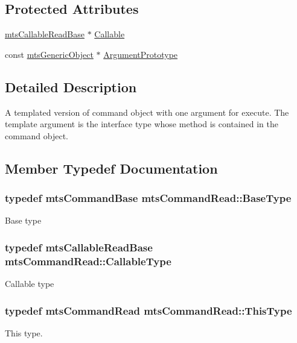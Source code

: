 \subsection*{Protected Attributes}
\begin{DoxyCompactItemize}
\item 
\hyperlink{classmts_callable_read_base}{mts\-Callable\-Read\-Base} $\ast$ \hyperlink{classmts_command_read_aa99a8b6be2493dfffc746078347ae0c8}{Callable}
\item 
const \hyperlink{classmts_generic_object}{mts\-Generic\-Object} $\ast$ \hyperlink{classmts_command_read_ab99241122421dce8a29351f19b97e8c0}{Argument\-Prototype}
\end{DoxyCompactItemize}


\subsection{Detailed Description}
A templated version of command object with one argument for execute. The template argument is the interface type whose method is contained in the command object. 

\subsection{Member Typedef Documentation}
\hypertarget{classmts_command_read_a40bc517108c9ab125caf8477013eda34}{
\subsubsection[{Base\-Type}]{\setlength{\rightskip}{0pt plus 5cm}typedef {\bf mts\-Command\-Base} {\bf mts\-Command\-Read\-::\-Base\-Type}}}\label{classmts_command_read_a40bc517108c9ab125caf8477013eda34}
Base type \hypertarget{classmts_command_read_a5949311ea142c1c13cb29242c5151da6}{
\subsubsection[{Callable\-Type}]{\setlength{\rightskip}{0pt plus 5cm}typedef {\bf mts\-Callable\-Read\-Base} {\bf mts\-Command\-Read\-::\-Callable\-Type}}}\label{classmts_command_read_a5949311ea142c1c13cb29242c5151da6}
Callable type \hypertarget{classmts_command_read_aec958a1f6afb4ec00138f7867a1e25b9}{
\subsubsection[{This\-Type}]{\setlength{\rightskip}{0pt plus 5cm}typedef {\bf mts\-Command\-Read} {\bf mts\-Command\-Read\-::\-This\-Type}}}\label{classmts_command_read_aec958a1f6afb4ec00138f7867a1e25b9}
This type. 

